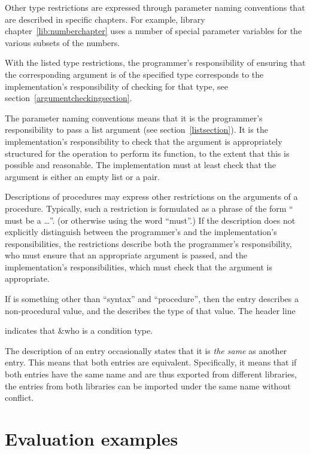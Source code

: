 Other type restrictions are expressed through parameter naming
conventions that are described in specific chapters.  For example,
library chapter~\ref{lib:numberchapter} uses a number of special
parameter variables for the various subsets of the numbers.

With the listed type restrictions, the programmer's responsibility of
ensuring that the corresponding argument is of the specified type
corresponds to the implementation's responsibility of checking for
that type, see section~\ref{argumentcheckingsection}.

The  parameter naming conventions means that it is the
programmer's responsibility to pass a list argument (see
section~\ref{listsection}).  It is the implementation's responsibility
to check that the argument is appropriately structured for the
operation to perform its function, to the extent that this is possible
and reasonable.  The implementation must at least check that the
argument is either an empty list or a pair.

Descriptions of procedures may express other restrictions on the
arguments of a procedure.  Typically, such a restriction is formulated
as a phrase of the form `` must be a \ldots''. (or otherwise
using the word ``must''.)  If the description does not explicitly
distinguish between the programmer's and the implementation's
responsibilities, the restrictions describe both the programmer's
responsibility, who must ensure that an appropriate argument is
passed, and the implementation's responsibilities, which must check
that the argument is appropriate.

If  is something other than ``syntax'' and
``procedure'', then the entry describes a non-procedural value, and
the  describes the type of that value.  The header line

\noindent{}

indicates that {\cf\&who} is a condition type.

The description of an entry occasionally states that it is \textit{the
  same} as another entry.  This means that both entries are
equivalent.  Specifically, it means that if both entries have the same
name and are thus exported from different libraries, the entries from
both libraries can be imported under the same name without conflict.

\section{Evaluation examples}

